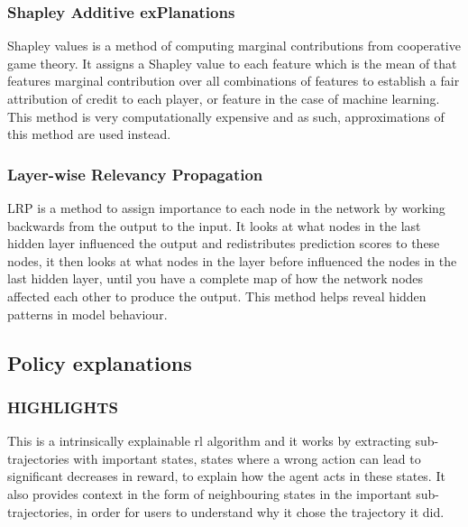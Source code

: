 \documentclass[UKenglish]{uiomasterthesis}
\begin{document}
\subsubsection{Shapley Additive exPlanations}
Shapley values is a method of computing marginal contributions from cooperative game theory. It assigns a Shapley value to each feature which is the mean of that features marginal contribution over all combinations of features to establish a fair attribution of credit to each player, or feature in the case of machine learning. This method is very computationally expensive and as such, approximations of this method are used instead.

\subsubsection{Layer-wise Relevancy Propagation}
LRP is a method to assign importance to each node in the network by working backwards from the output to the input. It looks at what nodes in the last hidden layer influenced the output and redistributes prediction scores to these nodes, it then looks at what nodes in the layer before influenced the nodes in the last hidden layer, until you have a complete map of how the network nodes affected each other to produce the output. This method helps reveal hidden patterns in model behaviour.

\subsection{Policy explanations}

\subsubsection{HIGHLIGHTS}
This is a intrinsically explainable \ac{rl} algorithm and it works by extracting sub-trajectories with important states, states where a wrong action can lead to significant decreases in reward, to explain how the agent acts in these states. It also provides context in the form of neighbouring states in the important sub-trajectories, in order for users to understand why it chose the trajectory it did.


\end{document}
